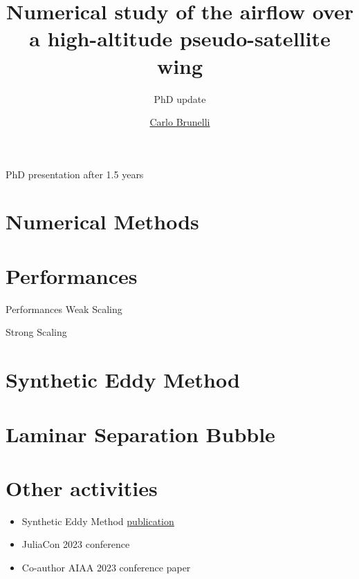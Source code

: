 \documentclass{beamer}
\title{Numerical study of the airflow over a high-altitude pseudo-satellite wing}
\subtitle{PhD update}
\author{\href{mailto:mail@carlobrunelli.com}{Carlo Brunelli}}
\begin{document}
\maketitle


\begin{frame}

PhD presentation after 1.5 years

\end{frame}

\section{Numerical Methods}



\section{Performances}

\begin{frame}{Performances}
Weak Scaling

Strong Scaling

\end{frame}


\section{Synthetic Eddy Method}



\section{Laminar Separation Bubble}




\section{Other activities}
\begin{frame}
\begin{itemize}
	\item Synthetic Eddy Method \href{https://www.theoj.org/joss-papers/joss.05565/10.21105.joss.05565.pdf}{publication}
	\item JuliaCon 2023 conference
	\item Co-author AIAA 2023 conference paper
\end{itemize}

\end{frame}
\end{document}
